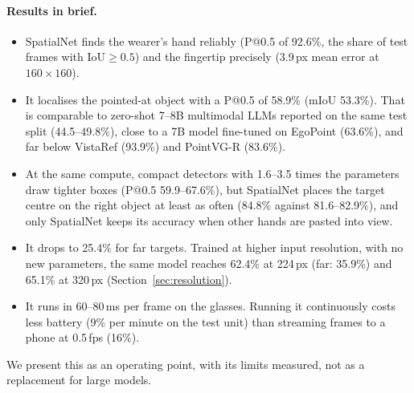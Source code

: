 \paragraph{Results in brief.}
\begin{itemize}
\item SpatialNet finds the wearer's hand reliably (P@0.5 of 92.6\%, the share of test frames with IoU${\geq}0.5$) and the fingertip precisely (3.9\,px mean error at $160\times160$).
\item It localises the pointed-at object with a P@0.5 of 58.9\% (mIoU 53.3\%). That is comparable to zero-shot 7--8B multimodal LLMs reported on the same test split (44.5--49.8\%), close to a 7B model fine-tuned on EgoPoint (63.6\%), and far below VistaRef (93.9\%) and PointVG-R (83.6\%).
\item At the same compute, compact detectors with 1.6--3.5 times the parameters draw tighter boxes (P@0.5 59.9--67.6\%), but SpatialNet places the target centre on the right object at least as often (84.8\% against 81.6--82.9\%), and only SpatialNet keeps its accuracy when other hands are pasted into view.
\item It drops to 25.4\% for far targets. Trained at higher input resolution, with no new parameters, the same model reaches 62.4\% at 224\,px (far: 35.9\%) and 65.1\% at 320\,px (Section~\ref{sec:resolution}).
\item It runs in 60--80\,ms per frame on the glasses. Running it continuously costs less battery (9\% per minute on the test unit) than streaming frames to a phone at 0.5\,fps (16\%).
\end{itemize}
We present this as an operating point, with its limits measured, not as a replacement for large models.

